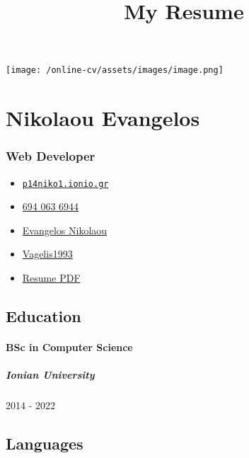 \documentclass[
]{article}
\title{My Resume}
\author{}
\date{}
\providecommand{\tightlist}{%
  \setlength{\itemsep}{0pt}\setlength{\parskip}{0pt}}
\begin{document}
\maketitle

\texttt{[image: /online-cv/assets/images/image.png]}

\hypertarget{nikolaou-evangelos}{%
\section{Nikolaou Evangelos}\label{nikolaou-evangelos}}

\hypertarget{web-developer}{%
\subsubsection{Web Developer}\label{web-developer}}

\begin{itemize}
\tightlist
\item
  \emph{} \href{mailto:p14niko1.ionio.gr}{\nolinkurl{p14niko1.ionio.gr}}
\item
  \emph{} \href{tel:694\%20063\%206944}{694 063 6944}
\item
  \emph{} \href{https://linkedin.com/in/Evangelos\%20Nikolaou}{Evangelos
  Nikolaou}
\item
  \emph{} \href{http://github.com/Vagelis1993}{Vagelis1993}
\item
  \emph{} \href{http://www.africau.edu/images/default/sample.pdf}{Resume
  PDF}
\end{itemize}

\hypertarget{education}{%
\subsection{Education}\label{education}}

\hypertarget{bsc-in-computer-science}{%
\paragraph{BSc in Computer Science}\label{bsc-in-computer-science}}

\hypertarget{ionian-university}{%
\subparagraph{Ionian University}\label{ionian-university}}

2014 - 2022

\hypertarget{languages}{%
\subsection{Languages}\label{languages}}
\end{document}
